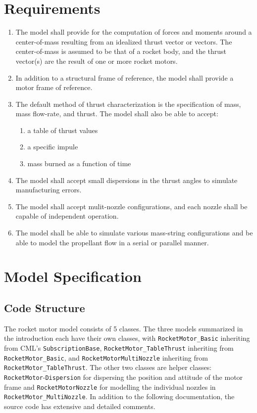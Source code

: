 \documentclass[11pt,fleqn]{report}
\begin{document}
\chapter{Requirements} 
\begin{enumerate}
\item The model shall provide for the computation of forces and moments around a center-of-mass resulting from an idealized thrust vector or vectors.  The center-of-mass is assumed to be that of a rocket body, and the thrust vector(s) are the result of one or more rocket motors.
\item In addition to a structural frame of reference, the model shall provide a motor frame of reference.
\item The default method of thrust characterization is the specification of mass, mass flow-rate, and thrust.  The model shall also be able to accept:
\begin{enumerate}
\item a table of thrust values
\item a specific impule
\item mass burned as a function of time
\end{enumerate}
\item The model shall accept small dispersions in the thrust angles to simulate manufacturing errors.
\item The model shall accept mulit-nozzle configurations, and each nozzle shall be capable of independent operation.
\item The model shall be able to simulate various mass-string configurations and be able to model the propellant flow in a serial or parallel manner.
\end{enumerate}

\chapter{Model Specification}
\section{Code Structure}
\par The rocket motor model consists of 5 classes. The three models summarized in the introduction each have their own classes, with \verb|RocketMotor_Basic| inheriting from CML's \verb|SubscriptionBase|, \verb|RocketMotor_TableThrust| inheriting from \verb|RocketMotor_Basic|, and \verb|RocketMotorMultiNozzle| inheriting from \verb|RocketMotor_TableThrust|. The other two classes are helper classes:   \verb|RocketMotor|-\verb|Dispersion| for dispersing the position and attitude of the motor frame and \verb|RocketMotorNozzle| for modelling the individual nozzles in \verb|RocketMotor_MultiNozzle|.  In addition to the following documentation, the source code has extensive and detailed comments.
\end{document}
